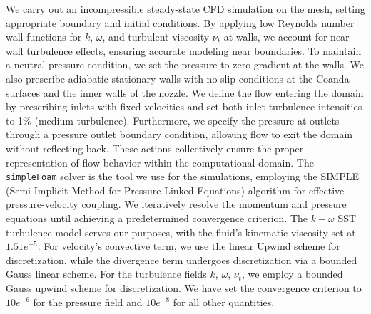 We carry out an incompressible steady-state CFD simulation on the mesh, setting appropriate boundary and initial conditions. By applying low Reynolds number wall functions for $k$, \( \omega \), and turbulent viscosity $\nu_t$ at walls, we account for near-wall turbulence effects, ensuring accurate modeling near boundaries. To maintain a neutral pressure condition, we set the pressure to zero gradient at the walls. We also prescribe adiabatic stationary walls with no slip conditions at the Coanda surfaces and the inner walls of the nozzle. We define the flow entering the domain by prescribing inlets with fixed velocities and set both inlet turbulence intensities to 1\% (medium turbulence). Furthermore, we specify the pressure at outlets through a pressure outlet boundary condition, allowing flow to exit the domain without reflecting back. These actions collectively ensure the proper representation of flow behavior within the computational domain. The \verb|simpleFoam| solver is the tool we use for the simulations, employing the SIMPLE (Semi-Implicit Method for Pressure Linked Equations) algorithm for effective pressure-velocity coupling. We iteratively resolve the momentum and pressure equations until achieving a predetermined convergence criterion. The $k-\omega$ SST turbulence model serves our purposes, with the fluid's kinematic viscosity set at $1.51e^{-5}$. For velocity's convective term, we use the linear Upwind scheme for discretization, while the divergence term undergoes discretization via a bounded Gauss linear scheme. For the turbulence fields $k$, $\omega$, $\nu_t$, we employ a bounded Gauss upwind scheme for discretization. We have set the convergence criterion to $10e^{-6}$ for the pressure field and $10e^{-8}$ for all other quantities.

